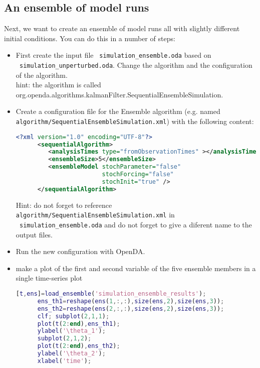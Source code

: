 \subsection{An ensemble of model runs}
Next, we want to create an ensemble of model runs all with slightly different initial conditions. 
      You can do this in a number of steps:
      \begin{itemize}
      \item First create the input file \texttt{ simulation\_ensemble.oda} based on\\
            \texttt{ simulation\_unperturbed.oda}. Change the algorithm and the
            configuration of the algorithm.\\
            hint: the algorithm is called \\
            org.openda.algorithms.kalmanFilter.SequentialEnsembleSimulation.
      \item Create a configuration file for the Ensemble algorithm (e.g. named\\
            \texttt{algorithm/SequentialEnsembleSimulation.xml}) with the following content:
      \begin{lstlisting}[language=XML,frame=single,caption={XML-input for sequentialAlgorithm}]
      <?xml version="1.0" encoding="UTF-8"?>
      <sequentialAlgorithm>
         <analysisTimes type="fromObservationTimes" ></analysisTimes>
         <ensembleSize>5</ensembleSize>
         <ensembleModel stochParameter="false"
                        stochForcing="false"
                        stochInit="true" />
      </sequentialAlgorithm>
      \end{lstlisting}
      Hint: do not forget to reference \texttt{ algorithm/SequentialEnsembleSimulation.xml} in \\ \texttt{ simulation\_ensemble.oda}
      and do not forget to give a diferent name to the output files.
      \item Run the new configuration with OpenDA.

      \item make a plot of the first and second variable of the five ensemble
      members in a single time-series plot
\ifshowmatlab
      \begin{lstlisting}[language=Matlab,frame=single,caption={Matlab}]
      [t,ens]=load_ensemble('simulation_ensemble_results');
      ens_th1=reshape(ens(1,:,:),size(ens,2),size(ens,3));
      ens_th2=reshape(ens(2,:,:),size(ens,2),size(ens,3));
      clf; subplot(2,1,1);
      plot(t(2:end),ens_th1);
      ylabel('\theta_1');
      subplot(2,1,2);
      plot(t(2:end),ens_th2);
      ylabel('\theta_2');
      xlabel('time');
      \end{lstlisting}
\fi
     

\end{itemize}
